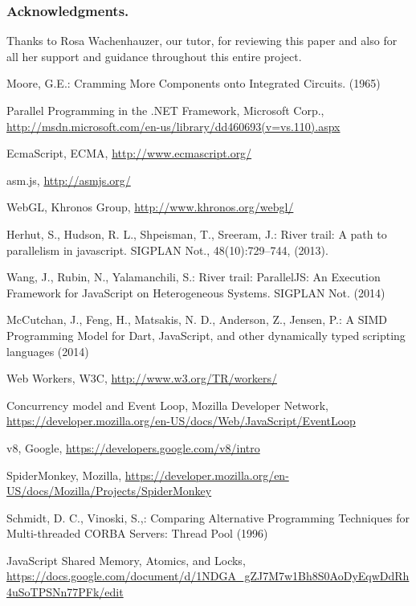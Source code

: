\documentclass[runningheads,a4paper]{llncs}
\begin{document}
\subsubsection*{Acknowledgments.}
Thanks to Rosa Wachenhauzer, our tutor, for reviewing this paper and also for all her support and guidance throughout this entire project.

\begin{thebibliography}{4}

 Moore, G.E.: Cramming More Components onto Integrated Circuits. (1965)

 Parallel Programming in the .NET Framework, Microsoft Corp., \url{http://msdn.microsoft.com/en-us/library/dd460693(v=vs.110).aspx}

 EcmaScript, ECMA, \url{http://www.ecmascript.org/}

 asm.js, \url{http://asmjs.org/}

 WebGL, Khronos Group, \url{http://www.khronos.org/webgl/}

 Herhut, S., Hudson, R. L., Shpeisman, T., Sreeram, J.: River trail: A path to parallelism in javascript. SIGPLAN Not., 48(10):729--744, (2013).

 Wang, J., Rubin, N., Yalamanchili, S.: River trail: ParallelJS: An Execution Framework for JavaScript on Heterogeneous Systems. SIGPLAN Not. (2014)

 McCutchan, J., Feng, H., Matsakis, N. D., Anderson, Z., Jensen, P.: A SIMD Programming Model for Dart, JavaScript, and other dynamically typed scripting languages (2014)

 Web Workers, W3C, \url{http://www.w3.org/TR/workers/}

 Concurrency model and Event Loop, Mozilla Developer Network, \url{https://developer.mozilla.org/en-US/docs/Web/JavaScript/EventLoop}

 v8, Google, \url{https://developers.google.com/v8/intro}

 SpiderMonkey, Mozilla, \url{https://developer.mozilla.org/en-US/docs/Mozilla/Projects/SpiderMonkey}

 Schmidt, D. C., Vinoski, S.,: Comparing Alternative Programming Techniques for Multi-threaded CORBA Servers: Thread Pool (1996)

 JavaScript Shared Memory, Atomics, and Locks, \url{https://docs.google.com/document/d/1NDGA_gZJ7M7w1Bh8S0AoDyEqwDdRh4uSoTPSNn77PFk/edit}


\end{thebibliography}
\end{document}
